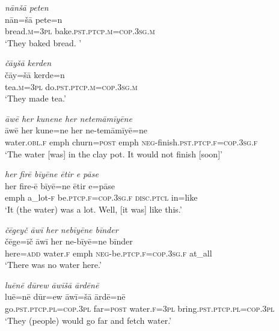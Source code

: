 \ea \label{ŽE.19}
\textit{nānšā peten} \\ 
\gll nān=šā pete=n \\ 
 bread\textsc{.m}\textsc{=3pl} bake\textsc{.pst}\textsc{.ptcp}\textsc{.m}\textsc{=cop}\textsc{.3sg}\textsc{.m} \\ 
\glt `They baked bread. '
\z 
 
\ea \label{ŽE.20}
\textit{čāyšā kerden} \\ 
\gll čāy=šā kerde=n \\ 
 tea\textsc{.m}\textsc{=3pl} do\textsc{.pst}\textsc{.ptcp}\textsc{.m}\textsc{=cop}\textsc{.3sg}\textsc{.m} \\ 
\glt `They made tea.'
\z 
 
\ea \label{ŽE.21}
\textit{āwē her kunene her netemāmīyēne} \\ 
\gll āwē her kune=ne her ne-temāmīyē=ne \\ 
 water\textsc{.obl}\textsc{.f} emph churn\textsc{=\textsc{post}} emph \textsc{neg-}finish\textsc{.pst}\textsc{.ptcp}\textsc{.f}\textsc{=cop}\textsc{.3sg}\textsc{.f} \\ 
\glt `The water [was] in the clay pot. It would not finish [soon]'
\z 
 
\ea \label{ŽE.22}
\textit{her firē bīyēne ētir e pāse} \\ 
\gll her fire-ē bīyē=ne ētir e=pāse \\ 
 emph a\_lot\textsc{-f} be\textsc{.ptcp}\textsc{.f}\textsc{=cop}\textsc{.3sg}\textsc{.f} \textsc{disc.ptcl} in=like \\ 
\glt `It (the water) was a lot. Well, [it was] like this.'
\z 
 
\ea \label{ŽE.23}
\textit{čēgeyč āwī her nebīyēne bīnder} \\ 
\gll čēge=īč āwī her ne-bīyē=ne bīnder \\ 
 here\textsc{=add} water\textsc{.f} emph \textsc{neg-}be\textsc{.ptcp}\textsc{.f}\textsc{=cop}\textsc{.3sg}\textsc{.f} at\_all \\ 
\glt `There was no water here.'
\z 
 
\ea \label{ŽE.24}
\textit{luēnē dūrew āwīšā ārdēnē} \\ 
\gll luē=nē dūr=ew āwī=šā ārdē=nē \\ 
 go\textsc{.pst}\textsc{.ptcp}\textsc{.pl}\textsc{=cop}\textsc{.3pl} far\textsc{=\textsc{post}} water\textsc{.f}\textsc{=3pl} bring\textsc{.pst}\textsc{.ptcp}\textsc{.pl}\textsc{=cop}\textsc{.3pl} \\ 
\glt `They (people) would go far and fetch water.'
\z 
 
